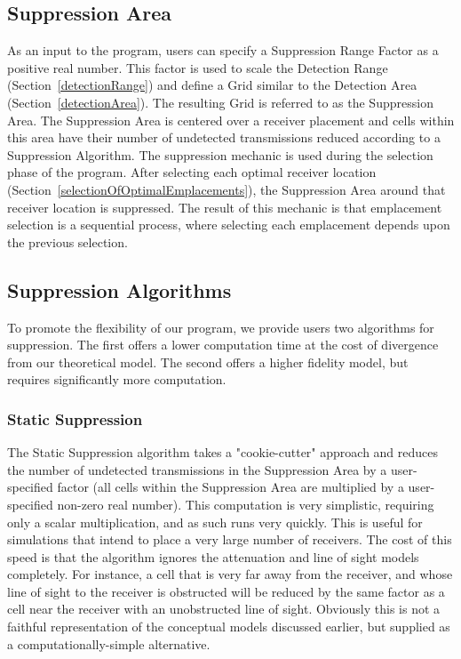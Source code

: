 \subsection{Suppression Area}
As an input to the program, users can specify a Suppression Range Factor as a positive real number.  This factor is used to scale the Detection Range (Section~\ref{detectionRange}) and define a Grid similar to the Detection Area (Section~\ref{detectionArea}).  The resulting Grid is referred to as the Suppression Area.  The Suppression Area is centered over a receiver placement and cells within this area have their number of undetected transmissions reduced according to a Suppression Algorithm.  The suppression mechanic is used during the selection phase of the program.  After selecting each optimal receiver location (Section~\ref{selectionOfOptimalEmplacements}), the Suppression Area around that receiver location is suppressed.  The result of this mechanic is that emplacement selection is a sequential process, where selecting each emplacement depends upon the previous selection.  

\subsection{Suppression Algorithms}
\label{suppressionAlgorithms}
To promote the flexibility of our program, we provide users two algorithms for suppression.  The first offers a lower computation time at the cost of divergence from our theoretical model.  The second offers a higher fidelity model, but requires significantly more computation.

\subsubsection{Static Suppression}
\label{staticSuppression}
The Static Suppression algorithm takes a "cookie-cutter" approach and reduces the number of undetected transmissions in the Suppression Area by a user-specified factor (all cells within the Suppression Area are multiplied by a user-specified non-zero real number).  This computation is very simplistic, requiring only a scalar multiplication, and as such runs very quickly.  This is useful for simulations that intend to place a very large number of receivers.  The cost of this speed is that the algorithm ignores the attenuation and line of sight models completely.  For instance, a cell that is very far away from the receiver, and whose line of sight to the receiver is obstructed will be reduced by the same factor as a cell near the receiver with an unobstructed line of sight.  Obviously this is not a faithful representation of the conceptual models discussed earlier, but supplied as a computationally-simple alternative.

